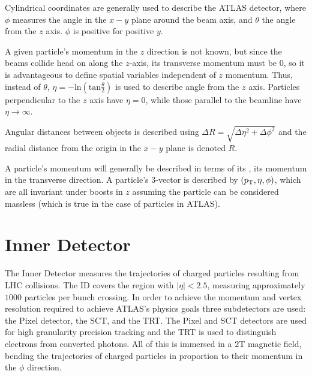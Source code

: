 Cylindrical coordinates are generally used to describe the \ac{ATLAS} detector, where $\phi$ measures the angle in the $x-y$ plane around the beam axis, and $\theta$ the angle from the $z$ axis. $\phi$ is positive for positive $y$. 

A given particle's momentum in the $z$ direction is not known, but since the beams collide head on along the $z$-axis, its transverse momentum must be $0$, so it is advantageous to define spatial variables independent of $z$ momentum. Thus, instead of $\theta$, $\eta = - \textrm{ln}(\textrm{tan}\frac{\theta}{2})$ is used to describe angle from the $z$ axis. Particles perpendicular to the $z$ axis have $\eta = 0$, while those parallel to the beamline have $\eta \rightarrow \infty$. 

Angular distances between objects is described using $\Delta R = \sqrt{\Delta \eta ^2 + \Delta \phi ^2}$ and the radial distance from the origin in the $x-y$ plane is denoted $R$. 

A particle's momentum will generally be described in terms of its \pT, its momentum in the transverse direction. A particle's $3$-vector is described by $(p_{\text{T}}, \eta, \phi)$, which are all invariant under boosts in $z$ assuming the particle can be considered massless (which is true in the case of particles in \ac{ATLAS}).





\section{Inner Detector}
The Inner Detector measures the trajectories of charged particles resulting from \ac{LHC} collisions. The \ac{ID} covers the region with $|\eta| < 2.5$, measuring approximately $1000$ particles per bunch crossing. In order to achieve the momentum and vertex resolution required to achieve \ac{ATLAS}'s physics goals three subdetectors are used: the Pixel detector, the \ac{SCT}, and the \ac{TRT}. The Pixel and \ac{SCT} detectors are used for high granularity precision tracking and the \ac{TRT} is used to distinguish electrons from converted photons. All of this is immersed in a $2$T magnetic field, bending the trajectories of charged particles in proportion to their momentum in the $\phi$ direction.



